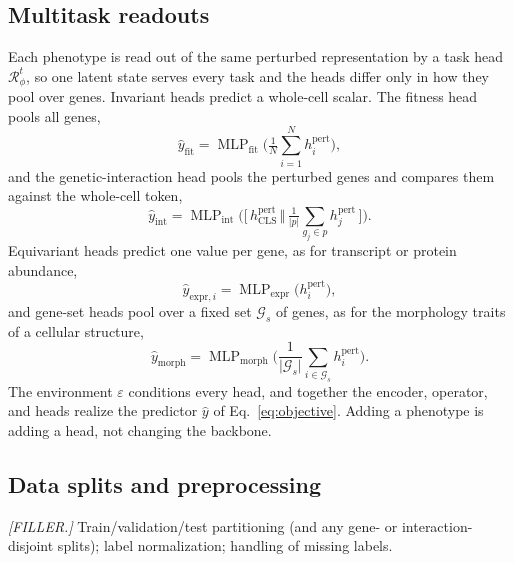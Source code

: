 \subsection*{Multitask readouts}
Each phenotype is read out of the same perturbed representation by a task head
$\mathcal{R}_\phi^{t}$, so one latent state serves every task and the heads differ only in
how they pool over genes. Invariant heads predict a whole-cell scalar. The fitness head
pools all genes,
\begin{equation}
\hat y_{\mathrm{fit}}=\operatorname{MLP}_{\mathrm{fit}}\!\Big(\tfrac{1}{N}\textstyle\sum_{i=1}^{N}h_i^{\mathrm{pert}}\Big),
\label{eq:fit}
\end{equation}
and the genetic-interaction head pools the perturbed genes and compares them against the
whole-cell token,
\begin{equation}
\hat y_{\mathrm{int}}=\operatorname{MLP}_{\mathrm{int}}\!\Big(\big[\,h_{\mathrm{CLS}}^{\mathrm{pert}}\,\big\Vert\,\tfrac{1}{\lvert p\rvert}\textstyle\sum_{g_j\in p}h_j^{\mathrm{pert}}\,\big]\Big).
\label{eq:int}
\end{equation}
Equivariant heads predict one value per gene, as for transcript or protein abundance,
\begin{equation}
\hat y_{\mathrm{expr},i}=\operatorname{MLP}_{\mathrm{expr}}\!\big(h_i^{\mathrm{pert}}\big),
\label{eq:expr}
\end{equation}
and gene-set heads pool over a fixed set $\mathcal{G}_s$ of genes, as for the morphology
traits of a cellular structure,
\begin{equation}
\hat y_{\mathrm{morph}}=\operatorname{MLP}_{\mathrm{morph}}\!\Big(\textstyle\frac{1}{\lvert\mathcal{G}_s\rvert}\sum_{i\in\mathcal{G}_s}h_i^{\mathrm{pert}}\Big).
\label{eq:morph}
\end{equation}
The environment $\varepsilon$ conditions every head, and together the encoder, operator,
and heads realize the predictor $\hat y$ of Eq.~\eqref{eq:objective}. Adding a phenotype is
adding a head, not changing the backbone.

\subsection*{Data splits and preprocessing}
\textit{[FILLER.]} Train/validation/test partitioning (and any gene- or
interaction-disjoint splits); label normalization; handling of missing labels.

